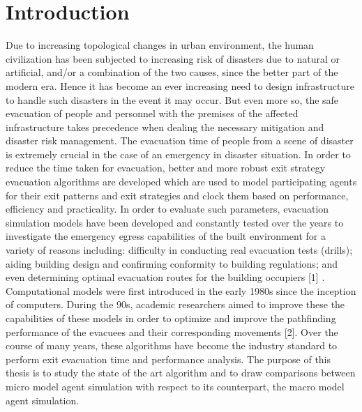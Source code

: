 
\chapter{Introduction\label{ch:intro}}

Due to increasing topological changes in urban environment, the human civilization has been subjected to increasing risk of disasters due to natural or artificial, and/or a combination of the two causes, since the better part of the modern era. Hence it has become an ever increasing need to design infrastructure to handle such disasters in the event it may occur. But even more so, the safe evacuation of people and personnel with the premises of the affected infrastructure takes precedence when dealing the necessary mitigation and disaster risk management. The evacuation time of people from a scene of disaster is extremely crucial in the case of an emergency in disaster situation. In order to reduce the time taken for evacuation, better and more robust exit strategy evacuation algorithms are developed which are used to model participating agents for their exit patterns and exit strategies and clock them based on performance, efficiency and practicality. In order to evaluate such parameters, evacuation simulation models have been developed and constantly tested over the years to investigate the emergency egress capabilities of the built environment for a variety of reasons including: difficulty in conducting real evacuation tests (drills); aiding building design and confirming conformity to building regulations; and even determining optimal evacuation routes for the building occupiers [1] \cite{inproceedings}. Computational models were first introduced in the early 1980s since the inception of computers. During the 90s, academic researchers aimed to improve these the capabilities of these models in order to optimize and improve the pathfinding performance of the evacuees and their corresponding movements [2]. Over the course of many years, these algorithms have become the industry standard to perform exit evacuation time and performance analysis. The purpose of this thesis is to study the state of the art algorithm and to draw comparisons between micro model agent simulation with respect to its counterpart, the macro model agent simulation.


